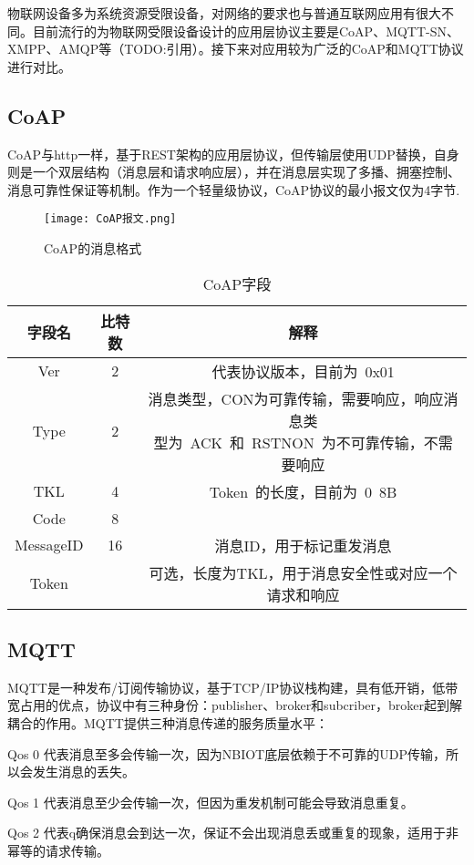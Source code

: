 物联网设备多为系统资源受限设备，对网络的要求也与普通互联网应用有很大不同。目前流行的为物联网受限设备设计的应用层协议主要是CoAP、MQTT-SN、XMPP、AMQP等（TODO:引用）。接下来对应用较为广泛的CoAP和MQTT协议进行对比。

\subsection{CoAP}
CoAP与http一样，基于REST架构的应用层协议，但传输层使用UDP替换，自身则是一个双层结构（消息层和请求响应层），并在消息层实现了多播、拥塞控制、消息可靠性保证等机制。作为一个轻量级协议，CoAP协议的最小报文仅为4字节.

\begin{figure}[h]
	\texttt{[image: CoAP报文.png]}
	\caption{CoAP的消息格式}
	\label{CoAP报文}
\end{figure}

  
\begin{table}[h!]
\caption{CoAP字段}
\begin{tabular}{ccc}
\toprule
字段名 & 比特数 & 解释\\
\midrule
Ver&2&代表协议版本，目前为 0x01 \\
Type&2&\makecell[c]{消息类型，CON为可靠传输，需要响应，响应消息类\\型为 ACK 和 RSTNON 为不可靠传输，不需要响应}\\
TKL&4&Token 的长度，目前为 0~8B \\ 
Code&8&	\\
MessageID&16&消息ID，用于标记重发消息\\
Token&&可选，长度为TKL，用于消息安全性或对应一个请求和响应\\
\bottomrule
\end{tabular}
\label{coap字段}
\end{table}


\subsection{MQTT}

MQTT是一种发布/订阅传输协议，基于TCP/IP协议栈构建，具有低开销，低带宽占用的优点，协议中有三种身份：publisher、broker和subcriber，broker起到解耦合的作用。MQTT提供三种消息传递的服务质量水平：

Qos 0 代表消息至多会传输一次，因为NBIOT底层依赖于不可靠的UDP传输，所以会发生消息的丢失。

Qos 1 代表消息至少会传输一次，但因为重发机制可能会导致消息重复。

Qos 2 代表q确保消息会到达一次，保证不会出现消息丢或重复的现象，适用于非幂等的请求传输。

